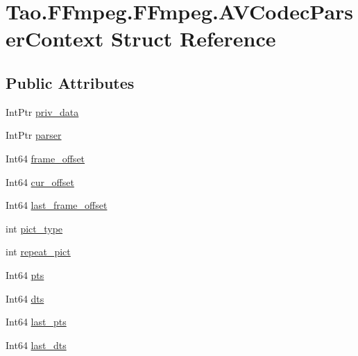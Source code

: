 \hypertarget{struct_tao_1_1_f_fmpeg_1_1_f_fmpeg_1_1_a_v_codec_parser_context}{
\section{Tao.FFmpeg.FFmpeg.AVCodecParserContext Struct Reference}
\label{struct_tao_1_1_f_fmpeg_1_1_f_fmpeg_1_1_a_v_codec_parser_context}
}
\subsection*{Public Attributes}
\begin{DoxyCompactItemize}
\item 
IntPtr \hyperlink{struct_tao_1_1_f_fmpeg_1_1_f_fmpeg_1_1_a_v_codec_parser_context_a47fe261a2fce3e3bc5c2b6df1d93dc3f}{priv\_\-data}
\item 
IntPtr \hyperlink{struct_tao_1_1_f_fmpeg_1_1_f_fmpeg_1_1_a_v_codec_parser_context_ad134346e093949f1206f6fd4d6b0dc1d}{parser}
\item 
Int64 \hyperlink{struct_tao_1_1_f_fmpeg_1_1_f_fmpeg_1_1_a_v_codec_parser_context_a6c48b749adecf7d5ac4d2398e5fe5446}{frame\_\-offset}
\item 
Int64 \hyperlink{struct_tao_1_1_f_fmpeg_1_1_f_fmpeg_1_1_a_v_codec_parser_context_a8f61b5f34afa4db240164b0ed5260fad}{cur\_\-offset}
\item 
Int64 \hyperlink{struct_tao_1_1_f_fmpeg_1_1_f_fmpeg_1_1_a_v_codec_parser_context_a43d9716374af120547c8b7ddc8c7dd0b}{last\_\-frame\_\-offset}
\item 
int \hyperlink{struct_tao_1_1_f_fmpeg_1_1_f_fmpeg_1_1_a_v_codec_parser_context_a0c79ff4253645597b1e16514537146d0}{pict\_\-type}
\item 
int \hyperlink{struct_tao_1_1_f_fmpeg_1_1_f_fmpeg_1_1_a_v_codec_parser_context_ab580d5e477e918c3cb7981e6159cbe0b}{repeat\_\-pict}
\item 
Int64 \hyperlink{struct_tao_1_1_f_fmpeg_1_1_f_fmpeg_1_1_a_v_codec_parser_context_a1d51fec5dfbaceb6e0ddef08d5f917c0}{pts}
\item 
Int64 \hyperlink{struct_tao_1_1_f_fmpeg_1_1_f_fmpeg_1_1_a_v_codec_parser_context_aaf57102e8753d377f99b6ab80c6e17b8}{dts}
\item 
Int64 \hyperlink{struct_tao_1_1_f_fmpeg_1_1_f_fmpeg_1_1_a_v_codec_parser_context_a33efc1eb9a225d3632fd108b1c30c7de}{last\_\-pts}
\item 
Int64 \hyperlink{struct_tao_1_1_f_fmpeg_1_1_f_fmpeg_1_1_a_v_codec_parser_context_a534d717dfdf2322c4e1d2084fc26363f}{last\_\-dts}

\end{DoxyCompactItemize}
